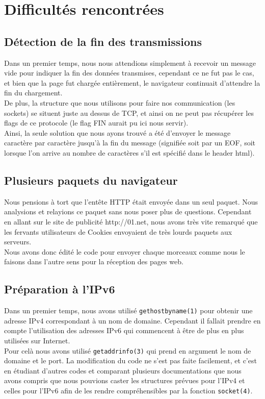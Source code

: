 \documentclass{scrreprt}
\def\code#1{\texttt{#1}}
\begin{document}
\section{Difficultés rencontrées}

\subsection{Détection de la fin des transmissions}
Dans un premier temps, nous nous attendions simplement à recevoir un message vide pour indiquer la fin des données transmises, cependant ce ne fut pas le cas, et bien que la page fut chargée entièrement, le navigateur continuait d'attendre la fin du chargement. \\
De plus, la structure que nous utilisons pour faire nos communication (les sockets) se situent juste au dessus de TCP, et ainsi on ne peut pas récupérer les flags de ce protocole (le flag FIN aurait pu ici nous servir).\\
Ainsi, la seule solution que nous ayons trouvé a été d'envoyer le message caractère par caractère jusqu'à la fin du message (signifiée soit par un EOF, soit lorsque l'on arrive au nombre de caractères s'il est spécifié dans le header html).

\subsection{Plusieurs paquets du navigateur}
Nous pensions à tort que l'entête HTTP était envoyée dans un seul paquet. Nous analysions et relayions ce paquet sans nous poser plus de questions. Cependant en allant sur le site de publicité http://01.net, nous avons très vite remarqué que les fervants utilisateurs de Cookies envoyaient de très lourds paquets aux serveurs.\\
Nous avons donc édité le code pour envoyer chaque morceaux comme nous le faisons dans l'autre sens pour la réception des pages web.

\subsection{Préparation à l'IPv6}
Dans un premier temps, nous avons utilisé \code{gethostbyname(1)} pour obtenir une adresse IPv4 correspondant à un nom de domaine. Cependant il fallait prendre en compte l'utilisation des adresses IPv6 qui commencent à être de plus en plus utilisées sur Internet.\\
Pour celà nous avons utilisé \code{getaddrinfo(3)} qui prend en argument le nom de domaine et le port. La modification du code ne s'est pas faite facilement, et c'est en étudiant d'autres codes et comparant plusieurs documentations que nous avons compris que nous pouvions caster les structures prévues pour l'IPv4 et celles pour l'IPv6 afin de les rendre compréhensibles par la fonction \code{socket(4)}.
\end{document}
